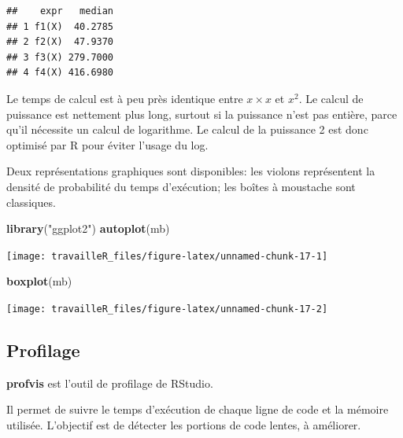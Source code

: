 \documentclass[
  12pt,
  french,
  a4paper,
  extrafontsizes,onecolumn,openright
  ]{memoir}
\newenvironment{Shaded}{\begin{snugshade}}{\end{snugshade}}
\newcommand{\KeywordTok}[1]{\textcolor[rgb]{0.13,0.29,0.53}{\textbf{#1}}}
\newcommand{\NormalTok}[1]{#1}
\newcommand{\StringTok}[1]{\textcolor[rgb]{0.31,0.60,0.02}{#1}}
\begin{document}
\begin{verbatim}
##    expr   median
## 1 f1(X)  40.2785
## 2 f2(X)  47.9370
## 3 f3(X) 279.7000
## 4 f4(X) 416.6980
\end{verbatim}

\normalsize

Le temps de calcul est à peu près identique entre \(x \times x\) et \(x^2\).
Le calcul de puissance est nettement plus long, surtout si la puissance n'est pas entière, parce qu'il nécessite un calcul de logarithme.
Le calcul de la puissance 2 est donc optimisé par R pour éviter l'usage du log.

Deux représentations graphiques sont disponibles: les violons représentent la densité de probabilité du temps d'exécution; les boîtes à moustache sont classiques.

\scriptsize

\begin{Shaded}
\begin{Highlighting}[]
\KeywordTok{library}\NormalTok{(}\StringTok{"ggplot2"}\NormalTok{)}
\KeywordTok{autoplot}\NormalTok{(mb)}
\end{Highlighting}
\end{Shaded}

\begin{center}\texttt{[image: travailleR\_files/figure-latex/unnamed-chunk-17-1]} \end{center}

\begin{Shaded}
\begin{Highlighting}[]
\KeywordTok{boxplot}\NormalTok{(mb)}
\end{Highlighting}
\end{Shaded}

\begin{center}\texttt{[image: travailleR\_files/figure-latex/unnamed-chunk-17-2]} \end{center}

\normalsize

\hypertarget{profilage}{%
\subsection{Profilage}\label{profilage}}

\textbf{profvis} est l'outil de profilage de RStudio.

Il permet de suivre le temps d'exécution de chaque ligne de code et la mémoire utilisée.
L'objectif est de détecter les portions de code lentes, à améliorer.
\end{document}
